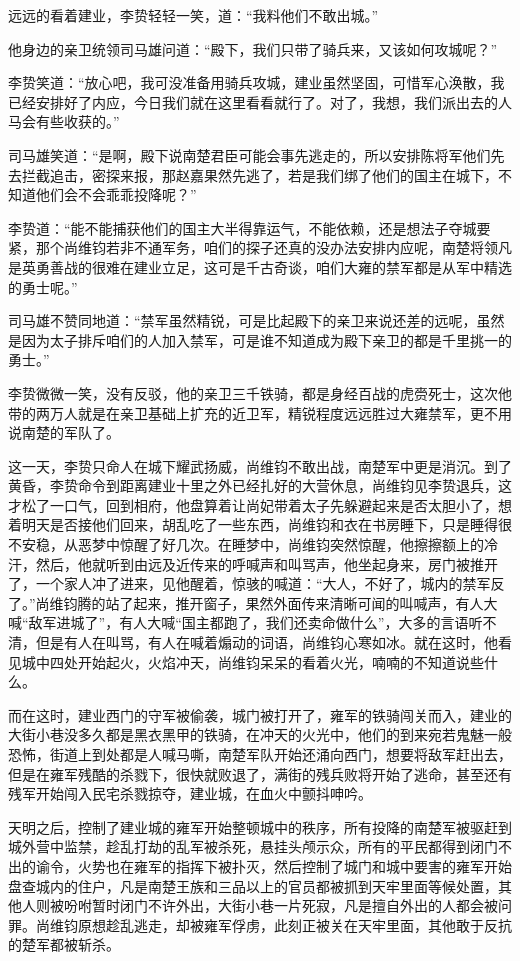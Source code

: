 远远的看着建业，李贽轻轻一笑，道：“我料他们不敢出城。”

他身边的亲卫统领司马雄问道：“殿下，我们只带了骑兵来，又该如何攻城呢？”

李贽笑道：“放心吧，我可没准备用骑兵攻城，建业虽然坚固，可惜军心涣散，我已经安排好了内应，今日我们就在这里看看就行了。对了，我想，我们派出去的人马会有些收获的。”

司马雄笑道：“是啊，殿下说南楚君臣可能会事先逃走的，所以安排陈将军他们先去拦截追击，密探来报，那赵嘉果然先逃了，若是我们绑了他们的国主在城下，不知道他们会不会乖乖投降呢？”

李贽道：“能不能捕获他们的国主大半得靠运气，不能依赖，还是想法子夺城要紧，那个尚维钧若非不通军务，咱们的探子还真的没办法安排内应呢，南楚将领凡是英勇善战的很难在建业立足，这可是千古奇谈，咱们大雍的禁军都是从军中精选的勇士呢。”

司马雄不赞同地道：“禁军虽然精锐，可是比起殿下的亲卫来说还差的远呢，虽然是因为太子排斥咱们的人加入禁军，可是谁不知道成为殿下亲卫的都是千里挑一的勇士。”

李贽微微一笑，没有反驳，他的亲卫三千铁骑，都是身经百战的虎赍死士，这次他带的两万人就是在亲卫基础上扩充的近卫军，精锐程度远远胜过大雍禁军，更不用说南楚的军队了。

这一天，李贽只命人在城下耀武扬威，尚维钧不敢出战，南楚军中更是消沉。到了黄昏，李贽命令到距离建业十里之外已经扎好的大营休息，尚维钧见李贽退兵，这才松了一口气，回到相府，他盘算着让尚妃带着太子先躲避起来是否太胆小了，想着明天是否接他们回来，胡乱吃了一些东西，尚维钧和衣在书房睡下，只是睡得很不安稳，从恶梦中惊醒了好几次。在睡梦中，尚维钧突然惊醒，他擦擦额上的冷汗，然后，他就听到由远及近传来的呼喊声和叫骂声，他坐起身来，房门被推开了，一个家人冲了进来，见他醒着，惊骇的喊道：“大人，不好了，城内的禁军反了。”尚维钧腾的站了起来，推开窗子，果然外面传来清晰可闻的叫喊声，有人大喊“敌军进城了”，有人大喊“国主都跑了，我们还卖命做什么”，大多的言语听不清，但是有人在叫骂，有人在喊着煽动的词语，尚维钧心寒如冰。就在这时，他看见城中四处开始起火，火焰冲天，尚维钧呆呆的看着火光，喃喃的不知道说些什么。

而在这时，建业西门的守军被偷袭，城门被打开了，雍军的铁骑闯关而入，建业的大街小巷没多久都是黑衣黑甲的铁骑，在冲天的火光中，他们的到来宛若鬼魅一般恐怖，街道上到处都是人喊马嘶，南楚军队开始还涌向西门，想要将敌军赶出去，但是在雍军残酷的杀戮下，很快就败退了，满街的残兵败将开始了逃命，甚至还有残军开始闯入民宅杀戮掠夺，建业城，在血火中颤抖呻吟。

天明之后，控制了建业城的雍军开始整顿城中的秩序，所有投降的南楚军被驱赶到城外营中监禁，趁乱打劫的乱军被杀死，悬挂头颅示众，所有的平民都得到闭门不出的谕令，火势也在雍军的指挥下被扑灭，然后控制了城门和城中要害的雍军开始盘查城内的住户，凡是南楚王族和三品以上的官员都被抓到天牢里面等候处置，其他人则被吩咐暂时闭门不许外出，大街小巷一片死寂，凡是擅自外出的人都会被问罪。尚维钧原想趁乱逃走，却被雍军俘虏，此刻正被关在天牢里面，其他敢于反抗的楚军都被斩杀。

